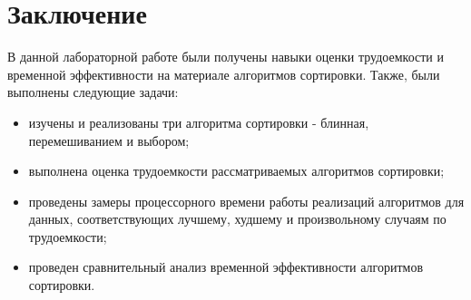\chapter*{Заключение}

В данной лабораторной работе были получены навыки оценки трудоемкости и временной
эффективности на материале алгоритмов сортировки. Также, были выполнены следующие задачи:

\begin{itemize}
	\item изучены и реализованы три алгоритма сортировки - блинная, перемешиванием и выбором;
	
	\item выполнена оценка трудоемкости рассматриваемых алгоритмов сортировки;
	
	\item проведены замеры процессорного времени работы реализаций
	алгоритмов для данных, соответствующих лучшему, худшему и произвольному
	случаям по трудоемкости;
	
	\item проведен сравнительный анализ временной эффективности алгоритмов сортировки.
\end{itemize}
